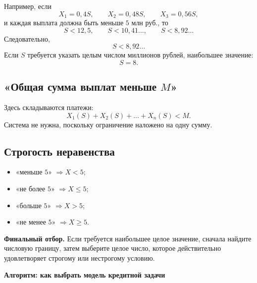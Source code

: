 \documentclass[a4paper,12pt]{article}
\newcommand{\key}[1]{\textcolor{darkaccent}{\textbf{#1}}}
\begin{document}
Например, если
\[
X_1=0{,}4S,\qquad X_2=0{,}48S,\qquad X_3=0{,}56S,
\]
и каждая выплата должна быть меньше $5$ млн руб., то
\[
S<12{,}5,\qquad S<10{,}41\ldots,\qquad S<8{,}92\ldots
\]
Следовательно,
\[
S<8{,}92\ldots
\]
Если $S$ требуется указать целым числом миллионов рублей, наибольшее значение:
\[
\boxed{S=8.}
\]

\subsection*{«Общая сумма выплат меньше $M$»}
Здесь складываются платежи:
\[
\boxed{X_1(S)+X_2(S)+\dots+X_n(S)<M.}
\]
Система не нужна, поскольку ограничение наложено на одну сумму.

\subsection*{Строгость неравенства}
\begin{itemize}
\item «меньше $5$» $\Rightarrow X<5$;
\item «не более $5$» $\Rightarrow X\le 5$;
\item «больше $5$» $\Rightarrow X>5$;
\item «не менее $5$» $\Rightarrow X\ge 5$.
\end{itemize}

\key{Финальный отбор.} Если требуется наибольшее целое значение, сначала найдите числовую границу, затем выберите целое число, которое действительно удовлетворяет строгому или нестрогому условию.

\clearpage

\thispagestyle{plain}
\begin{center}
{\Large\bfseries\textcolor{darkaccent}{Алгоритм: как выбрать модель кредитной задачи}}\par
\vspace{0.8cm}
\end{center}
\end{document}
